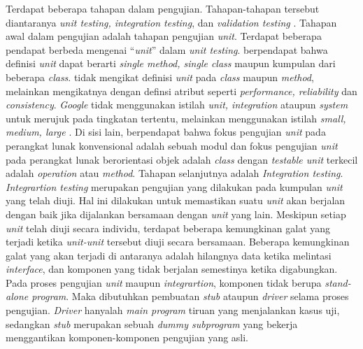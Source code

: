 Terdapat beberapa tahapan dalam pengujian. Tahapan-tahapan tersebut
diantaranya \emph{unit testing, integration testing}, dan \emph{validation
  testing} \parencite{presman2010software}. Tahapan awal dalam pengujian adalah
tahapan pengujian \emph{unit}. Terdapat beberapa
pendapat berbeda mengenai ``\emph{unit}'' dalam \emph{unit
  testing}. \textcite{martin2014unittest} berpendapat bahwa definisi
\emph{unit} dapat berarti \emph{single method, single class} maupun
kumpulan dari beberapa \emph{class}. \textcite{osherove2015art} tidak
mengikat definisi \emph{unit} pada \emph{class} maupun
\emph{method}, melainkan mengikatnya dengan definsi atribut seperti
\emph{performance, reliability} dan \emph{consistency}. \emph{Google}
tidak menggunakan istilah \emph{unit, integration} ataupun
\emph{system} untuk merujuk pada tingkatan tertentu, melainkan
menggunakan istilah \emph{small, medium, large}
\parencite{whittaker2012google}. Di sisi lain,
\textcite{presman2010software} berpendapat bahwa fokus pengujian
\emph{unit} pada perangkat lunak konvensional adalah sebuah modul dan
fokus pengujian \emph{unit} pada perangkat lunak berorientasi objek
adalah \emph{class} dengan \emph{testable unit} terkecil adalah
\emph{operation} atau \emph{method}. Tahapan selanjutnya adalah \emph{Integration
  testing}. \emph{Integrartion testing} merupakan pengujian yang
dilakukan pada kumpulan \emph{unit} yang telah diuji. Hal ini
dilakukan untuk memastikan suatu \emph{unit} akan berjalan dengan baik
jika dijalankan bersamaan dengan \emph{unit} yang lain. Meskipun
setiap \emph{unit} telah diuji secara individu, terdapat beberapa
kemungkinan galat yang terjadi ketika \emph{unit-unit} tersebut diuji
secara bersamaan. Beberapa kemungkinan galat yang akan terjadi di
antaranya adalah hilangnya data ketika melintasi \emph{interface}, dan
komponen yang tidak berjalan semestinya ketika digabungkan. Pada
proses pengujian \emph{unit} maupun \emph{integrartion}, komponen
tidak berupa \emph{stand-alone program}. Maka dibutuhkan pembuatan
\emph{stub} ataupun \emph{driver} selama proses pengujian.
\emph{Driver} hanyalah \emph{main program} tiruan yang menjalankan
kasus uji, sedangkan \emph{stub} merupakan sebuah \emph{dummy
  subprogram} yang bekerja menggantikan komponen-komponen pengujian
yang asli.

